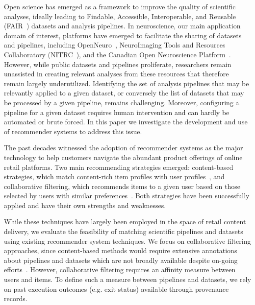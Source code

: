 \documentclass[conference]{IEEEtran}
\begin{document}
Open science has emerged as a framework to improve the quality of
scientific analyses, ideally leading to Findable, Accessible, Interoperable, and
Reusable (FAIR~\cite{wilkinson2016fair}) datasets and analysis pipelines. In
neuroscience, our main application domain of interest, platforms have
emerged to facilitate the sharing of datasets and pipelines, including
OpenNeuro~\cite{gorgolewski2017openneuro}, NeuroImaging Tools and Resources Collaboratory (NITRC~\cite{kennedy2016nitrc}), and the Canadian Open
Neuroscience Platform~\cite{conp}. However, while public
datasets and pipelines proliferate, researchers remain unassisted in
creating relevant analyses from these resources that therefore remain
largely underutilized. Identifying the set of analysis pipelines that may
be relevantly applied to a given dataset, or conversely the list of datasets that may be processed by
a given pipeline, remains challenging. Moreover, configuring a pipeline for a given dataset requires human intervention and can hardly be automated or brute forced. In this paper we investigate
the development and use of recommender systems to address this issue.


The past decades witnessed the adoption of recommender systems as the major
 technology to help customers navigate the abundant product offerings of
 online retail platforms. Two main
 recommending strategies emerged: content-based strategies, which match content-rich item profiles with user profiles~\cite{pazzani2007content},
 and collaborative filtering, which recommends items to a given user based on those
 selected by users with similar preferences~\cite{rajaraman2011mining}.
 Both strategies have been successfully applied and have their own strengths and weaknesses.
 
 While these techniques have largely been employed in the space of retail
 content delivery, we evaluate the feasibility of matching scientific pipelines and datasets
 using existing recommender system techniques. We focus on collaborative
 filtering approaches, since content-based methods would require extensive
 annotations about pipelines and datasets which are not broadly available
 despite on-going
 efforts~\cite{NeuroimagingDataModel,sansone2017dats,DATSDocumentation}.
 However, collaborative filtering requires an affinity measure
 between users and items. To define such a measure between pipelines and
 datasets, we rely on past execution outcomes (e.g. exit status) available through provenance records.
\end{document}
